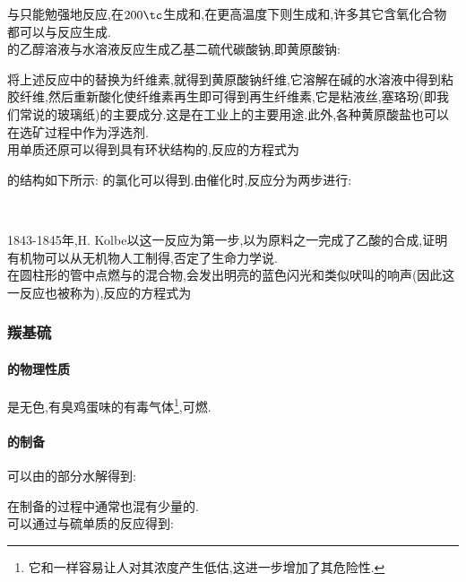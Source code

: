 \documentclass{ctexart}
\begin{document}
\indent {}与只能勉强地反应,在$200\tc$生成和,在更高温度下则生成和,许多其它含氧化合物都可以与反应生成.\\
\indent {}的乙醇溶液与水溶液反应生成乙基二硫代碳酸钠,即黄原酸钠:
\begin{center}
\end{center}
将上述反应中的替换为纤维素,就得到黄原酸钠纤维,它溶解在碱的水溶液中得到粘胶纤维,然后重新酸化使纤维素再生即可得到再生纤维素,它是粘液丝,塞珞玢(即我们常说的玻璃纸)的主要成分.这是在工业上的主要用途.此外,各种黄原酸盐也可以在选矿过程中作为浮选剂.\\
\indent 用单质还原可以得到具有环状结构的,反应的方程式为
\begin{center}
\end{center}
的结构如下所示:
\indent {}的氯化可以得到.由催化时,反应分为两步进行:
\begin{center}
    \\
\end{center}
1843-1845年,H. Kolbe以这一反应为第一步,以为原料之一完成了乙酸的合成,证明有机物可以从无机物人工制得,否定了生命力学说.\\
\indent 在圆柱形的管中点燃与的混合物,会发出明亮的蓝色闪光和类似吠叫的响声(因此这一反应也被称为),反应的方程式为
\begin{center}
\end{center}
\subsubsection{羰基硫}
\paragraph{的物理性质}
是无色,有臭鸡蛋味的有毒气体\footnote{它和一样容易让人对其浓度产生低估,这进一步增加了其危险性.},可燃.
\paragraph{的制备}
可以由的部分水解得到:
\begin{center}
\end{center}
在制备的过程中通常也混有少量的.\\
\indent {}可以通过与硫单质的反应得到:
\begin{center}
\end{center}
\end{document}
